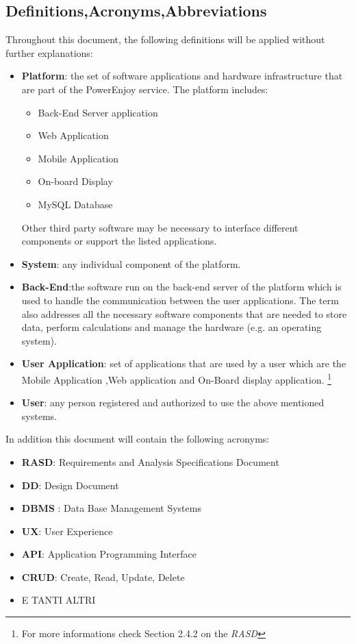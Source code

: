\subsection{Definitions,Acronyms,Abbreviations}
Throughout this document, the following definitions will be applied without
further explanations:
\begin{itemize}
\item \textbf{Platform}: the set of software applications and hardware infrastructure that are part of the PowerEnjoy service. The platform includes:
	\begin{itemize}
	\item Back-End Server application
	\item Web Application
	\item Mobile Application
	\item On-board Display
	\item MySQL Database
	\end{itemize}
	Other third party software may be necessary to interface different components 	
	or support the listed applications.
\item \textbf{System}: any individual component of the platform.
\item \textbf{Back-End}:the software run on the back-end server of the platform which is used to handle the communication between the user applications. The
term also addresses all the necessary software components that are needed
to store data, perform calculations and manage the hardware (e.g. an operating
system).
\item \textbf{User Application}: set of applications that are used by a user which are the Mobile Application ,Web application and On-Board display application.
\footnote{For more informations check Section 2.4.2 on the \emph{RASD}} 
\item \textbf{User}: any person registered and authorized to use the above mentioned systems.
\end{itemize}
In addition this document will contain the following acronyms:
\begin{itemize}
\item \textbf{RASD}: Requirements and Analysis Specifications Document
\item \textbf{DD}: Design Document
\item \textbf{DBMS} : Data Base Management Systems
\item \textbf{UX}: User Experience
\item \textbf{API}: Application Programming Interface 
\item \textbf{CRUD}: Create, Read, Update, Delete 
\item E TANTI ALTRI
\end{itemize}


